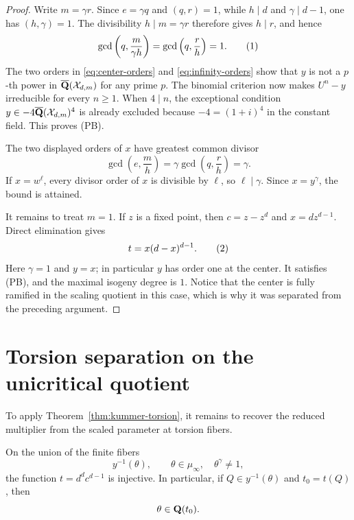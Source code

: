 \begin{proof}
Write $m=\gamma r$.  Since $e=\gamma q$ and $(q,r)=1$, while $h\mid d$
and $\gamma\mid d-1$, one has $(h,\gamma)=1$.  The divisibility
$h\mid m=\gamma r$ therefore gives $h\mid r$, and hence
\[
 \gcd\left(q,\frac{m}{\gamma h}\right)
 =\gcd\left(q,\frac rh\right)=1.
 \numberthis\label{eq:coprime-orders}
\]
The two orders in \eqref{eq:center-orders} and
\eqref{eq:infinity-orders} show that $y$ is not a $p$-th power in
$\overline{\mathbf Q}(\mathcal X_{d,m})$ for any prime $p$.  The binomial
criterion \cite[Chapter VI, \S9, Theorem 9.1]{Lang2002} now makes
$U^n-y$ irreducible for every $n\ge1$.  When $4\mid n$, the exceptional
condition $y\in-4\overline{\mathbf Q}(\mathcal X_{d,m})^4$ is already excluded
because $-4=(1+i)^4$ in the constant field.  This proves (PB).

The two displayed orders of $x$ have greatest common divisor
\[
 \gcd\left(e,\frac mh\right)
 =\gamma\gcd\left(q,\frac rh\right)=\gamma.
\]
If $x=w^\ell$, every divisor order of $x$ is divisible by $\ell$, so
$\ell\mid\gamma$.  Since $x=y^\gamma$, the bound is attained.

It remains to treat $m=1$.  If $z$ is a fixed point, then
$c=z-z^d$ and $x=dz^{d-1}$.  Direct elimination gives
\[
 t=x(d-x)^{d-1}.
 \numberthis\label{eq:period-one-curve}
\]
Here $\gamma=1$ and $y=x$; in particular $y$ has order one at the center.
It satisfies (PB), and the maximal isogeny degree is $1$.  Notice that
the center is fully ramified in the scaling quotient in this case,
which is why it was separated from the preceding argument.
\end{proof}

\section{Torsion separation on the unicritical quotient}
\label{sec:unicritical-separation}

To apply Theorem~\ref{thm:kummer-torsion}, it remains to recover the
reduced multiplier from the scaled parameter at torsion fibers.

\begin{proposition}
\label{prop:unicritical-separation}
On the union of the finite fibers
\[
 y^{-1}(\theta),\qquad
 \theta\in\mu_\infty,\quad \theta^\gamma\ne1,
\]
the function $t=d^dc^{d-1}$ is injective.  In particular, if
$Q\in y^{-1}(\theta)$ and $t_0=t(Q)$, then
\[
 \theta\in\mathbf Q(t_0).
\]
\end{proposition}

